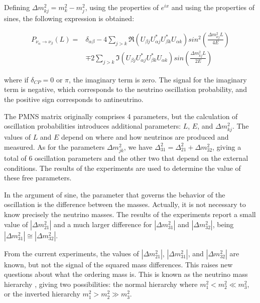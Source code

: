 Defining $\Delta m^2_{kj}=m^2_k - m^2_j$, using the properties of $e^{ix}$ and using the properties of sines, the following expression is obtained:

\begin{equation}
    \begin{split}
        P_{\nu_\alpha\rightarrow\nu_\beta}(L) = & \delta_{\alpha\beta} - 4\sum_{j>k}\Re\left(U_{\beta j} U^*_{\alpha j} U^*_{\beta k} U_{\alpha k}\right) sin^2\left(\frac{\Delta m^2_{kj}L}{4E}\right) \\
        & \mp 2\sum_{j>k}\Im\left(U_{\beta j} U^*_{\alpha j} U^*_{\beta k} U_{\alpha k}\right) sin\left(\frac{\Delta m^2_{kj}L}{2E}\right)
    \end{split}
\end{equation}

where if $\delta_{CP}= 0$ or $\pi$, the imaginary term is zero. The signal for the imaginary term is negative, which corresponds to the neutrino oscillation probability, and the positive sign corresponds to antineutrino. 

The PMNS matrix originally comprises 4 parameters, but the calculation of oscillation probabilities introduces additional parameters: $L$, $E$, and $\Delta m^2_{kj}$. The values of $L$ and $E$ depend on where and how neutrinos are produced and measured. As for the parameters $\Delta m^2_{jk}$, we have $\Delta^2_{31} = \Delta^2_{21} + \Delta m^2_{32}$, giving a total of 6 oscillation parameters and the other two that depend on the external conditions. The results of the experiments are used to determine the value of these free parameters.

In the argument of sine, the parameter that governs the behavior of the oscillation is the difference between the masses. Actually, it is not necessary to know precisely the neutrino masses. The results of the experiments report a small value of $|\Delta m^2_{21}|$ and a much larger difference for $|\Delta m^2_{31}|$ and $|\Delta m^2_{32}|$, being $|\Delta m^2_{31}| \cong |\Delta m^2_{32}|$. 

From the current experiments, the values of $|\Delta m^2_{21}|$, $|\Delta m^2_{31}|$, and $|\Delta m^2_{32}|$ are known, but not the signal of the squared mass differences. This raises new questions about what the ordering mass is. This is known as the neutrino mass hierarchy , giving two possibilities: the normal hierarchy where $m^2_1 < m^2_2 \ll m^2_3$, or the inverted hierarchy $m^2_1 > m^2_2 \gg m^2_3$.

